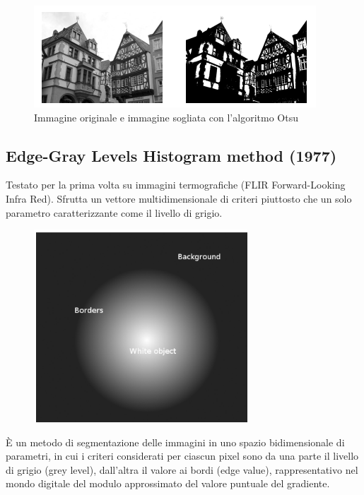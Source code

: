\begin{figure}[H]
    \centering
    \includegraphics[width=\linewidth, keepaspectratio]{capitoli/immagini/imgs/otsu.png}
    \caption{Immagine originale e immagine sogliata con l'algoritmo Otsu}
\end{figure}

\subsection{Edge-Gray Levels Histogram method (1977)}
Testato per la prima volta su immagini
termografiche (FLIR Forward-Looking Infra Red). Sfrutta un vettore
multidimensionale di criteri piuttosto che un solo parametro
caratterizzante come il livello di grigio.

\begin{figure}[H]
    \centering
    \includegraphics[width=8cm, keepaspectratio]{capitoli/immagini/imgs/rosenfeld.png}
\end{figure}

È un metodo di segmentazione delle immagini in uno spazio bidimensionale di parametri, in cui i criteri considerati per ciascun
pixel sono da una parte il livello di grigio (grey level), dall'altra il valore ai bordi (edge value), rappresentativo nel mondo digitale del
modulo approssimato del valore puntuale del gradiente.

